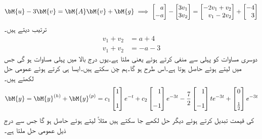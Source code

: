 \begin{gather*}
\begin{aligned}
\bM{u}-3\bM{v}=\bM{A}\bM{v}+\bM{g}
\end{aligned}\implies
\begin{aligned}
\begin{bmatrix*}[r] a\\-a  \end{bmatrix*}-\begin{bmatrix} 3v_1\\3v_2 \end{bmatrix}=\begin{bmatrix*}[r] -2v_1+v_2\\v_1-2v_2 \end{bmatrix*}+\begin{bmatrix*}[r] -4\\3 \end{bmatrix*}
\end{aligned} 
\end{gather*}
ترتیب دیتے ہیں۔
\begin{align*}
v_1+v_2&=a+4\\
v_1+v_2&=-a-3
\end{align*}
دوسری مساوات کو پہلی سے منفی کرتے ہوئے  یعنی  ملتا ہے۔یوں درج بالا میں پہلی مساوات  ہو گی جس  میں   لیتے ہوئے   حاصل ہوتا ہے۔اس طرح  ہو گا۔ہم  چن سکتے ہیں۔ایسا ہی کرتے ہوئے عمومی حل لکھتے ہیں۔
\begin{align}
\bM{y}=\bM{y}^{(h)}+\bM{y}^{(p)}=c_1\begin{bmatrix} 1 \\[1em] 1 \end{bmatrix}e^{-t}+c_2\begin{bmatrix*}[r] 1\\[1em] -1 \end{bmatrix*}e^{-3t}-\frac{7}{2}\begin{bmatrix*}[r] 1\\[1em] -1 \end{bmatrix*}te^{-3t}+\begin{bmatrix} 0\\[1em]\frac{1}{2} \end{bmatrix}e^{-3t}
\end{align}
 کی قیمت تبدیل کرتے ہوئے دیگر حل لکھے جا سکتے ہیں مثلاً  لیتے ہوئے  حاصل ہو گا جس سے درج ذیل عمومی حل ملتا ہے۔
